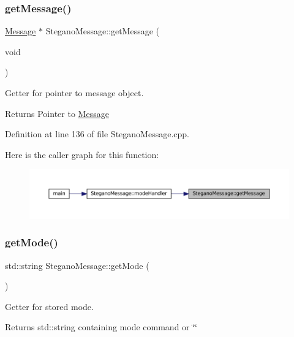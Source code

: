 \subsubsection{\texorpdfstring{getMessage()}{getMessage()}}
{\footnotesize\ttfamily \mbox{\hyperlink{classMessage}{Message}} $\ast$ Stegano\+Message\+::get\+Message (\begin{DoxyParamCaption}\item[{void}]{ }\end{DoxyParamCaption})}



Getter for pointer to message object. 

\begin{DoxyReturn}{Returns}
Pointer to \mbox{\hyperlink{classMessage}{Message}} 
\end{DoxyReturn}


Definition at line 136 of file Stegano\+Message.\+cpp.

Here is the caller graph for this function\+:\nopagebreak
\begin{figure}[H]
\begin{center}
\leavevmode
\includegraphics[width=350pt]{classSteganoMessage_ad29978e925056ad70dc5c45b1e1681eb_icgraph}
\end{center}
\end{figure}
\mbox{\label{classSteganoMessage_a7dc660e6d2c8f162636f789cfedde67e}} 
\subsubsection{\texorpdfstring{getMode()}{getMode()}}
{\footnotesize\ttfamily std\+::string Stegano\+Message\+::get\+Mode (\begin{DoxyParamCaption}{ }\end{DoxyParamCaption})}



Getter for stored mode. 

\begin{DoxyReturn}{Returns}
std\+::string containing mode command or \char`\"{}\char`\"{} 
\end{DoxyReturn}


